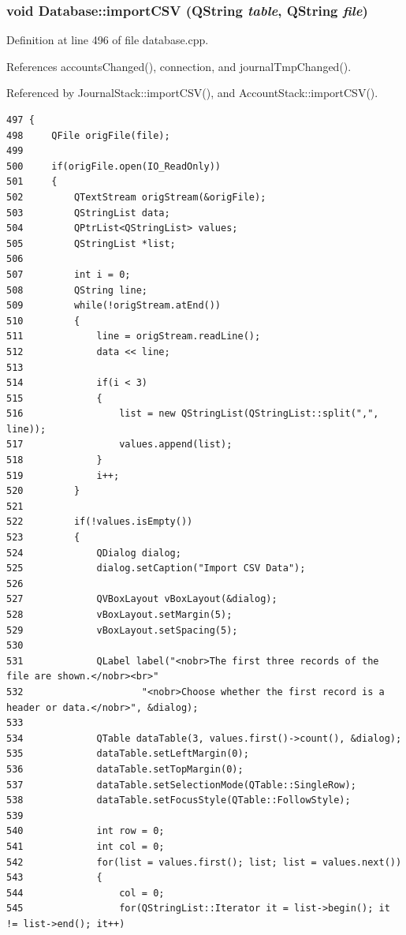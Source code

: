 \hypertarget{classDatabase_a15}{
\subsubsection[importCSV]{\setlength{\rightskip}{0pt plus 5cm}void Database::import\-CSV (QString {\em table}, QString {\em file})}}
\label{classDatabase_a15}


Definition at line 496 of file database.cpp.

References accounts\-Changed(), connection, and journal\-Tmp\-Changed().

Referenced by Journal\-Stack::import\-CSV(), and Account\-Stack::import\-CSV().

\footnotesize\begin{verbatim}497 {
498     QFile origFile(file);
499     
500     if(origFile.open(IO_ReadOnly))
501     {
502         QTextStream origStream(&origFile);
503         QStringList data;
504         QPtrList<QStringList> values;
505         QStringList *list;
506         
507         int i = 0;
508         QString line;
509         while(!origStream.atEnd())
510         {
511             line = origStream.readLine();
512             data << line;
513             
514             if(i < 3)
515             {
516                 list = new QStringList(QStringList::split(",", line));
517                 values.append(list);
518             }
519             i++;
520         }
521         
522         if(!values.isEmpty())
523         {
524             QDialog dialog;
525             dialog.setCaption("Import CSV Data");
526             
527             QVBoxLayout vBoxLayout(&dialog);
528             vBoxLayout.setMargin(5);
529             vBoxLayout.setSpacing(5);
530             
531             QLabel label("<nobr>The first three records of the file are shown.</nobr><br>"
532                     "<nobr>Choose whether the first record is a header or data.</nobr>", &dialog);
533             
534             QTable dataTable(3, values.first()->count(), &dialog);
535             dataTable.setLeftMargin(0);
536             dataTable.setTopMargin(0);
537             dataTable.setSelectionMode(QTable::SingleRow);
538             dataTable.setFocusStyle(QTable::FollowStyle);
539             
540             int row = 0;
541             int col = 0;
542             for(list = values.first(); list; list = values.next())
543             {
544                 col = 0;
545                 for(QStringList::Iterator it = list->begin(); it != list->end(); it++)

\end{verbatim}
